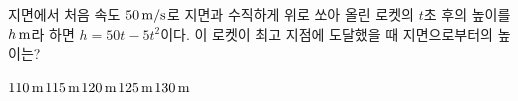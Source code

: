 지면에서 처음 속도 $50\mkern3mu \mathrm{m/s}$로 지면과 수직하게 위로 쏘아 올린 로켓의 $t$초 후의 높이를 $h\mkern3mu \mathrm{m}$라 하면 $h=50t-5t^2$이다. 이 로켓이 최고 지점에 도달했을 때 지면으로부터의 높이는?
\begin{choices32}{$110\mkern3mu \mathrm{m}$}{$115\mkern3mu \mathrm{m}$}{$120\mkern3mu \mathrm{m}$}{$125\mkern3mu \mathrm{m}$}{$130\mkern3mu \mathrm{m}$}\end{choices32}
